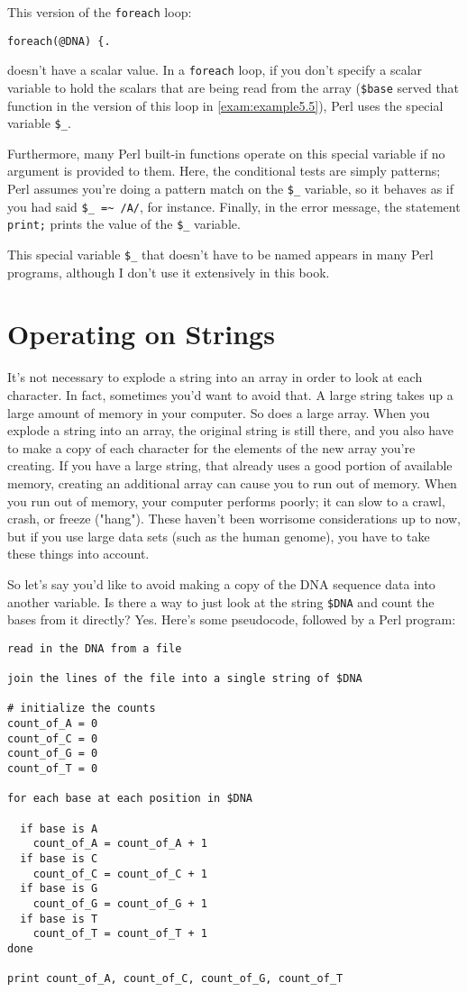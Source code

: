 This version of the \verb|foreach| loop:

\begin{lstlisting}
foreach(@DNA) {.
\end{lstlisting}

doesn't have a scalar value. In a \verb|foreach| loop, if you don't specify a scalar variable to hold the scalars that are being read from the array (\verb|$base| served that function in the version of this loop in \autoref{exam:example5.5}), Perl uses the special variable \verb|$_|.

Furthermore, many Perl built-in functions operate on this special variable if no argument is provided to them. Here, the conditional tests are simply patterns; Perl assumes you're doing a pattern match on the \verb|$_| variable, so it behaves as if you had said \verb|$_ =~ /A/|, for instance.  Finally, in the error message, the statement \verb|print;| prints the value of the \verb|$_| variable.

This special variable \verb|$_| that doesn't have to be named appears in many Perl programs, although I don't use it extensively in this book. 

\section{Operating on Strings}
It's not necessary to explode a string into an array in order to look at each character. In fact, sometimes you'd want to avoid that. A large string takes up a large amount of memory in your computer. So does a large array. When you explode a string into an array, the original string is still there, and you also have to make a copy of each character for the elements of the new array you're creating. If you have a large string, that already uses a good portion of available memory, creating an additional array can cause you to run out of memory. When you run out of memory, your computer performs poorly; it can slow to a crawl, crash, or freeze ("hang"). These haven't been worrisome considerations up to now, but if you use large data sets (such as the human genome), you have to take these things into account.

So let's say you'd like to avoid making a copy of the DNA sequence data into another variable. Is there a way to just look at the string \verb|$DNA| and count the bases from it directly? Yes. Here's some pseudocode, followed by a Perl program: 

\begin{lstlisting}
read in the DNA from a file

join the lines of the file into a single string of $DNA

# initialize the counts
count_of_A = 0
count_of_C = 0
count_of_G = 0
count_of_T = 0

for each base at each position in $DNA

  if base is A
    count_of_A = count_of_A + 1
  if base is C
    count_of_C = count_of_C + 1
  if base is G
    count_of_G = count_of_G + 1
  if base is T
    count_of_T = count_of_T + 1
done

print count_of_A, count_of_C, count_of_G, count_of_T
\end{lstlisting}

